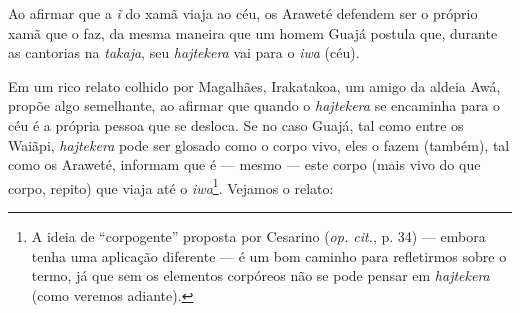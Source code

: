 Ao afirmar que a \emph{ĩ} do xamã viaja ao céu, os Araweté defendem ser
o próprio xamã que o faz, da mesma maneira que um homem Guajá postula
que, durante as cantorias na \emph{takaja}, seu \emph{hajtekera} vai
para o \emph{iwa} (céu).

Em um rico relato colhido por Magalhães, Irakatakoa, um amigo da aldeia
Awá, propõe algo semelhante, ao afirmar que quando o
\emph{hajtekera} se encaminha para o céu é a própria pessoa que se
desloca. Se no caso Guajá, tal como entre os Waiãpi, \emph{hajtekera}
pode ser glosado como o corpo vivo, eles o fazem (também), tal como os
Araweté, informam que é --- mesmo --- este corpo (mais vivo do que corpo,
repito) que viaja até o \emph{iwa}\footnote{A ideia de ``corpogente''
  proposta por Cesarino (\emph{op. cit.}, p. 34) --- embora tenha uma aplicação
  diferente --- é um bom caminho para refletirmos sobre o termo, já que
  sem os elementos corpóreos não se pode pensar em \emph{hajtekera}
  (como veremos adiante).}. Vejamos o relato:

